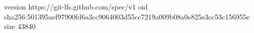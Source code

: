 version https://git-lfs.github.com/spec/v1
oid sha256:501395aef97900fd6a3cc9064003d55cc7219a009b08a0e825e3cc53c156955e
size 43840

